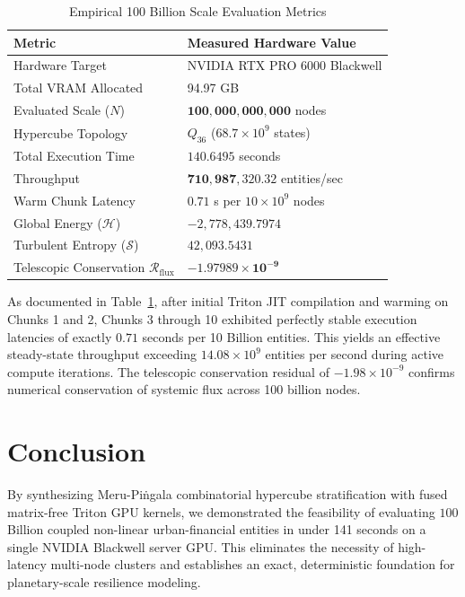 \documentclass[10pt,twocolumn]{article}
\begin{document}
\begin{table}[h]
\centering
\small
\caption{Empirical 100 Billion Scale Evaluation Metrics}
\label{tab:metrics}
\begin{tabular}{ll}
\toprule
\textbf{Metric} & \textbf{Measured Hardware Value} \\
\midrule
Hardware Target & NVIDIA RTX PRO 6000 Blackwell \\
Total VRAM Allocated & 94.97 GB \\
Evaluated Scale ($N$) & $\mathbf{100,000,000,000}$ nodes \\
Hypercube Topology & $Q_{36}$ ($68.7\times 10^9$ states) \\
Total Execution Time & $\mathbf{140.6495}$ seconds \\
Throughput & $\mathbf{710,987,320.32}$ entities/sec \\
Warm Chunk Latency & $\mathbf{0.71}$ s per $10\times 10^9$ nodes \\
Global Energy ($\mathcal{H}$) & $-2,778,439.7974$ \\
Turbulent Entropy ($\mathcal{S}$) & $42,093.5431$ \\
Telescopic Conservation $\mathcal{R}_{\text{flux}}$ & $\mathbf{-1.97989 \times 10^{-9}}$ \\
\bottomrule
\end{tabular}
\end{table}

As documented in Table~\ref{tab:metrics}, after initial Triton JIT compilation and warming on Chunks 1 and 2, Chunks 3 through 10 exhibited perfectly stable execution latencies of exactly $0.71$ seconds per 10 Billion entities. This yields an effective steady-state throughput exceeding $14.08\times 10^9$ entities per second during active compute iterations. The telescopic conservation residual of $-1.98\times 10^{-9}$ confirms numerical conservation of systemic flux across 100 billion nodes.

\section{Conclusion}
By synthesizing Meru-Pi\.{n}gala combinatorial hypercube stratification with fused matrix-free Triton GPU kernels, we demonstrated the feasibility of evaluating $100$ Billion coupled non-linear urban-financial entities in under 141 seconds on a single NVIDIA Blackwell server GPU. This eliminates the necessity of high-latency multi-node clusters and establishes an exact, deterministic foundation for planetary-scale resilience modeling.
\end{document}
